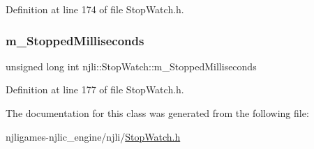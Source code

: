 Definition at line 174 of file Stop\+Watch.\+h.

\mbox{\label{classnjli_1_1_stop_watch_a90f72afdaba0072fc81c3d11953e0a1c}} 
\subsubsection{\texorpdfstring{m\+\_\+\+Stopped\+Milliseconds}{m\_StoppedMilliseconds}}
{\footnotesize\ttfamily unsigned long int njli\+::\+Stop\+Watch\+::m\+\_\+\+Stopped\+Milliseconds\hspace{0.3cm}{\ttfamily [private]}}



Definition at line 177 of file Stop\+Watch.\+h.



The documentation for this class was generated from the following file\+:\begin{DoxyCompactItemize}
\item 
njligames-\/njlic\+\_\+engine/njli/\mbox{\hyperlink{_stop_watch_8h}{Stop\+Watch.\+h}}\end{DoxyCompactItemize}
